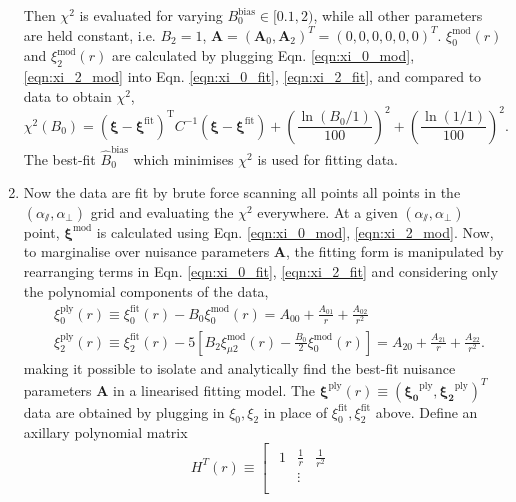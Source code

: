 \documentclass[10pt,A4]{aastex62}
\begin{document}
\begin{enumerate}
			Then $\chi^2$ is evaluated for varying $B^\text{bias}_0 \in [0.1, 2)$, while all other parameters are held constant, i.e. $B_2=1$, $\bm{A} = (\bm{A}_0, \bm{A}_2)^T = (0, 0, 0, 0, 0, 0)^T$. $ \xi^\text{mod} _0 (r)$ and $\xi^\text{mod} _2 (r)$ are calculated by plugging Eqn. \ref{eqn:xi_0_mod}, \ref{eqn:xi_2_mod} into Eqn. \ref{eqn:xi_0_fit}, \ref{eqn:xi_2_fit}, and compared to data to obtain $\chi^2$,
			\begin{equation}
				\chi^2 (B_0) = (\bm{\xi} - \bm{\xi}^\text{fit})^\text{T} C^{-1} (\bm{\xi} - \bm{\xi}^\text{fit}) + \left( \frac{\ln(B_0/1)}{100} \right) ^2
				+ \left( \frac{\ln(1/1)}{100} \right) ^2 .
			\end{equation}
			The best-fit $\hat{B}^\text{bias}_0$ which minimises $\chi^2$ is used for fitting data.
			
			\item 
			Now the data are fit by brute force scanning all points all points in the $(\alpha_\varparallel, \alpha_\perp)$ grid and evaluating the $\chi^2$ everywhere. At a given $(\alpha_\varparallel, \alpha_\perp)$ point, $\bm{\xi}^\text{mod}$ is calculated using Eqn. \ref{eqn:xi_0_mod}, \ref{eqn:xi_2_mod}. Now, to marginalise over nuisance parameters $\bm{A}$, the fitting form is manipulated by rearranging terms in Eqn. \ref{eqn:xi_0_fit}, \ref{eqn:xi_2_fit} and considering only the polynomial components of the data,
			\begin{align}
				& \xi_0^\text{ply} (r) \equiv \xi _0^\text{fit} (r) - B_0 \xi_0^\text{mod}(r) =  A_{00} + \frac{A_{01}}{r} + \frac{A_{02}}{r^2} \\
				& \xi_2^\text{ply} (r) \equiv \xi _2^\text{fit} (r) - 5 \left[ B_2 \xi_{\mu 2}^\text{mod} (r) - \frac{B_0}{2} \xi_0^\text{mod}  (r) \right] = A_{20} + \frac{A_{21}}{r} + \frac{A_{22}}{r^2} .
			\end{align}
			making it possible to isolate and analytically find the best-fit nuisance parameters $\bm{A}$ in a linearised fitting model. The $\bm{\xi} ^\text{ply} (r) \equiv (\bm{\xi_0}^\text{ply}, \bm{\xi_2}^\text{ply} )^T$ data are obtained by plugging in $\xi_0, \xi_2$ in place of $\xi_0^\text{fit}, \xi_2^\text{fit}$ above. Define an axillary polynomial matrix
			\begin{equation}
				H^T (r) \equiv 
				\left[
					\begin{array}{c|c}
						\begin{matrix}
							1	& \frac{1}{r}	& \frac{1}{r^2} \\
								& \vdots		& \\

\end{matrix}
\end{array}
\end{equation}
\end{enumerate}
\end{document}
